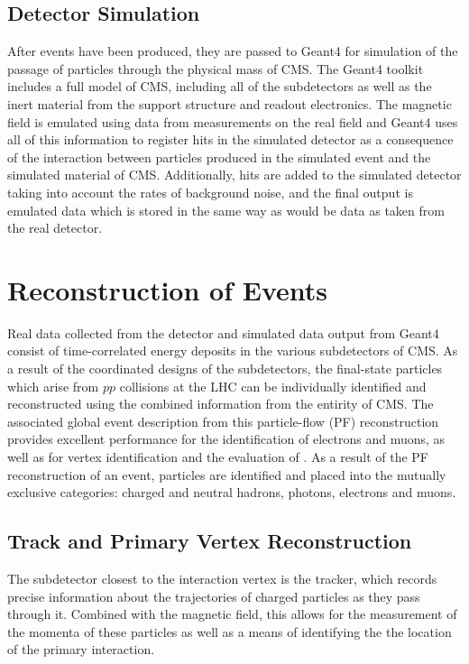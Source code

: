 \subsection{Detector Simulation}

 After events have been produced,
  they are passed to Geant4 
  for simulation of the passage of particles
  through the physical mass of CMS.
 The Geant4 toolkit includes a full
  model of CMS, including 
  all of the subdetectors as well as the
  inert material from the support structure
  and readout electronics.
 The magnetic field is emulated using
  data from measurements on the real field
  and Geant4 uses all of this information
  to register hits in the simulated
  detector as a consequence of the interaction
  between particles produced in the simulated
  event and the simulated material of CMS.
 Additionally, hits are added to the
  simulated detector taking into account
  the rates of background noise, and the
  final output is emulated data
  which is stored in the same way
  as would be data as taken from the real detector.



\section{Reconstruction of Events}\label{sec:reconstruction}

 Real data collected from the detector
  and simulated data output from Geant4
  consist of time-correlated energy deposits
  in the various subdetectors of CMS.
 As a result of the coordinated designs 
  of the subdetectors, the final-state 
  particles which arise from $pp$ collisions 
  at the LHC can be individually identified
  and reconstructed using the combined
  information from the entirity of CMS.
 The associated global event description
  from this particle-flow (PF) reconstruction
  provides excellent performance for
  the identification of electrons and muons,
  as well as for vertex identification
  and the evaluation of \met.
 As a result of the PF reconstruction
  of an event, particles are identified
  and placed into the mutually exclusive
  categories:
  charged and neutral hadrons, photons, 
  electrons and muons.
 
\subsection{Track and Primary Vertex Reconstruction}\label{sec:vertexreco}
 The subdetector closest to the interaction vertex
  is the tracker, which records precise
  information about the trajectories of 
  charged particles as they pass through it.
 Combined with the magnetic field, 
  this allows for the measurement of the
  momenta of these particles as well as a
  means of identifying the the location of
  the primary interaction.

